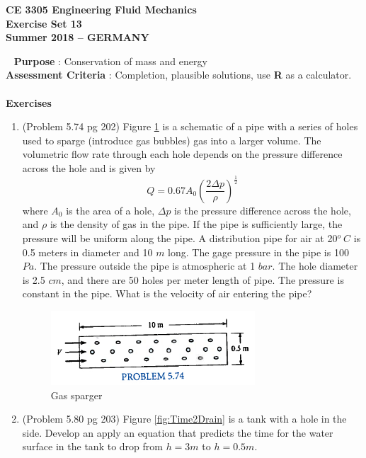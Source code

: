 \documentclass[12pt]{article}
\begin{document}
\begingroup
\begin{center}
{\textbf{{ CE 3305 Engineering Fluid Mechanics} \\ Exercise Set 13 \\ Summer 2018 -- GERMANY} }
\end{center}
\endgroup
\begingroup
~\newline
\textbf{Purpose} :  Conservation of mass and energy\\
\textbf{Assessment Criteria} : Completion, plausible solutions, use \textbf{R} as a calculator. \\~\\
\textbf{Exercises}

\begin{enumerate}
\item (Problem 5.74 pg 202)  Figure \ref{fig:GasSparger} is a schematic of a pipe with a series of holes used to sparge (introduce gas bubbles) gas into a larger volume.  
The volumetric flow rate through each hole depends on the pressure difference across the hole and is given by \\
\begin{equation}
Q = 0.67 A_0 (\frac{2 \Delta p }{\rho})^{\frac{1}{2}}
\end{equation}
where $A_0$ is the area of a hole, $\Delta p$ is the pressure difference across the hole, and $\rho$ is the density of gas in the pipe.
If the pipe is sufficiently large, the pressure will be uniform along the pipe.
A distribution pipe for air at 20$^o~C$ is 0.5 meters in diameter and 10 $m$ long. 
The gage pressure in the pipe is 100 $Pa$.
The pressure outside the pipe is atmospheric at 1 $bar$.
The hole diameter is 2.5 $cm$, and there are 50 holes per meter length of pipe.
The pressure is constant in the pipe.
What is the velocity of air entering the pipe?

\begin{figure}[h!] %
   \centering
   \includegraphics[width=3in]{GasSparger.jpg} 
   \caption{Gas sparger}
   \label{fig:GasSparger}
\end{figure}
\clearpage

\item (Problem 5.80 pg 203) Figure \ref{fig:Time2Drain} is a tank with a hole in the side.  Develop an apply an equation that predicts the time for the water surface in the tank to drop from $h = 3 m$ to $h = 0.5 m$.


\end{enumerate}
\end{document}
